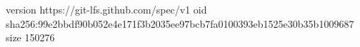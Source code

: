 version https://git-lfs.github.com/spec/v1
oid sha256:99e2bbdf90b052e4e171f3b2035ee97bcb7fa0100393eb1525e30b35b1009687
size 150276

